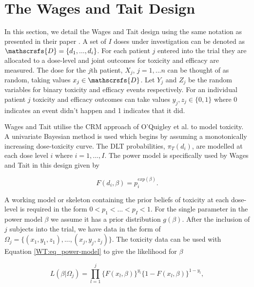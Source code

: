 \section{The Wages and Tait Design}
\label{WT:Wages-and-Tait-Design}

In this section, we detail the Wages and Tait design using the same notation as presented in their paper \cite{wagesSeamlessPhaseII2015}. A set of $I$ doses under investigation can be denoted as $\mathscrsfs{D} = \{d_1, ...,d_i\}$. For each patient $j$ entered into the trial they are allocated to a dose-level and joint outcomes for toxicity and efficacy are measured. The dose for the $j$th patient, $X_j$, $j = 1,...n$ can be thought of as random, taking values $x_j \in  \mathscrsfs{D}$. Let $Y_j$ and $Z_j$ be the random variables for binary toxicity and efficacy events respectively. For an individual patient $j$ toxicity and efficacy outcomes can take values $y_j, z_j \in \{0,1\}$ where 0 indicates an event didn't happen and 1 indicates that it did. 

Wages and Tait \cite{wagesSeamlessPhaseII2015} utilise the CRM approach of O'Quigley et al. \cite{oquigleyContinualReassessmentMethod1990} to model toxicity. A univariate Bayesian method is used which begins by assuming a monotonically increasing dose-toxicity curve. The DLT probabilities, $\pi_T(d_i)$, are modelled at each dose level $i$ where $i= 1, ..., I$. The power model is specifically used by Wages and Tait in this design given by 

\begin{equation}
	\label{WT:eq_power-model}
	F(d_i, \beta) = p_i^{exp(\beta)}.
\end{equation}

A working model or skeleton containing the prior beliefs of toxicity at each dose-level is required in the form $0 < p_1 < ... <p_I <1$. For the single parameter in the power model $\beta$ we assume it has a prior distribution $g(\beta)$. After the inclusion of $j$ subjects into the trial, we have  data in the form of $\Omega_j = \{(x_1,y_1,z_1), ..., (x_j,y_j,z_j)\}$. The toxicity data can be used with Equation \ref{WT:eq_power-model} to give the likelihood for $\beta$

\begin{equation}
	L(\beta|\Omega_j)=\prod_{l=1}^{j}\{F(x_l,\beta)\}^{y_l}\{1-F(x_l,\beta)\}^{1-y_l},  
\end{equation}

